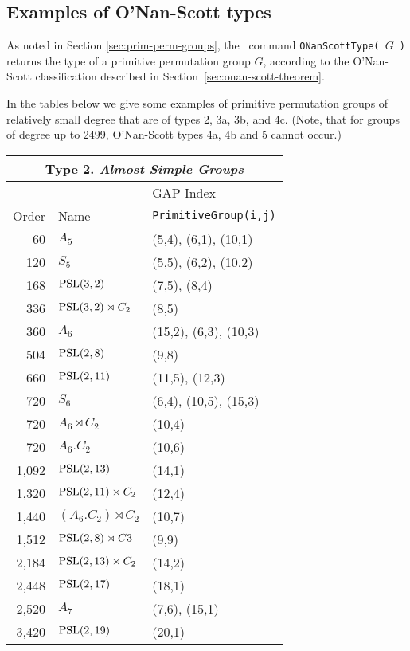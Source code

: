 \subsection{Examples of O'Nan-Scott types}
\label{sec:examples-onan-scott}
As noted in Section \ref{sec:prim-perm-groups}, the \GAP\ command {\tt ONanScottType( $G$ )}
returns the type of a primitive permutation group $G$, according to the
O'Nan-Scott classification described in
Section~\ref{sec:onan-scott-theorem}. 

In the tables below we give some examples of primitive permutation groups of relatively
small degree that are of types 2, 3a, 3b, and 4c.
(Note, that for groups of degree up to 2499, O'Nan-Scott types 4a, 4b and 5
cannot occur.)


{\small
  \begin{tabular}{r|l|l}
  \multicolumn{3}{c}{Type 2. \emph{Almost Simple Groups}}\\\toprule
  & & GAP Index \\
    Order & Name & {\tt PrimitiveGroup(i,j)} \\
\midrule
 60 & $A_5$ & (5,4), (6,1), (10,1) \\
 120 & $S_5$ & (5,5), (6,2), (10,2) \\
 168 & $\mathrm{PSL}(3,2)$ & (7,5), (8,4) \\
 336 & $\mathrm{PSL}(3,2) \rtimes C_2$ & (8,5) \\
 360 & $A_6$ & (15,2), (6,3), (10,3) \\
 504 & $\mathrm{PSL}(2,8)$ & (9,8) \\
 660 & $\mathrm{PSL}(2,11)$ & (11,5), (12,3) \\
 720 & $S_6$ & (6,4), (10,5), (15,3) \\
 720 & $A_6 \rtimes C_2$ & (10,4) \\
 720 & $A_6 . C_2$ & (10,6) \\
 1,092 & $\mathrm{PSL}(2,13)$ & (14,1) \\
 1,320 & $\mathrm{PSL}(2,11) \rtimes C_2$ & (12,4) \\
 1,440 & $(A_6 . C_2) \rtimes C_2$ & (10,7) \\
 1,512 & $\mathrm{PSL}(2,8) \rtimes C3$ & (9,9) \\
 2,184 & $\mathrm{PSL}(2,13) \rtimes C_2$ & (14,2) \\
 2,448 & $\mathrm{PSL}(2,17)$ & (18,1) \\
 2,520 & $A_7$ & (7,6), (15,1) \\
 3,420 & $\mathrm{PSL}(2,19)$ & (20,1) \\

\end{tabular}}
